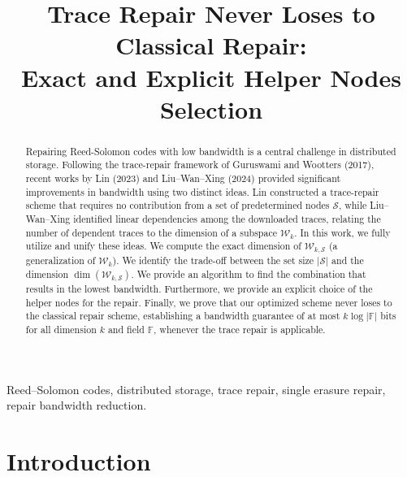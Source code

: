 \documentclass[onecolumn]{IEEEtran}
\title{Trace Repair Never Loses to Classical Repair:\\ Exact and Explicit Helper Nodes Selection 
}
\author{

   \IEEEauthorblockN{Wilton Kim, Stanislav Kruglik, Han Mao Kiah}
	
}
\theoremstyle{plain}
\theoremstyle{definition}
\newcommand{\FF}{\mathbb{F}}
\newcommand{\cS}{\mathcal{S}}
\newcommand{\cW}{\mathcal{W}}
\newcommand{\hanmao}[1]{{\color{magenta} (HM: #1)}}
\begin{document}
\date{}

\maketitle

\begin{abstract}
Repairing Reed-Solomon codes with low bandwidth is a central challenge in distributed storage. Following the trace-repair framework of Guruswami and Wootters (2017), recent works by Lin (2023) and Liu--Wan--Xing (2024) provided significant improvements in bandwidth using two distinct ideas. Lin constructed a trace-repair scheme that requires no contribution from a set of predetermined nodes $\cS$, while Liu--Wan--Xing identified linear dependencies among the downloaded traces, relating the number of dependent traces to the dimension of a subspace $\cW_k$.
In this work, we fully utilize and unify these ideas. We compute the exact dimension of $\cW_{k,\cS}$ (a generalization of $\cW_k$). We identify the trade-off between the set size $|\cS|$ and the dimension $\dim(\cW_{k,\cS})$. We provide an algorithm to find the combination that results in the lowest bandwidth. Furthermore, we provide an explicit choice of the helper nodes for the repair. Finally, we prove that our optimized scheme never loses to the classical repair scheme, establishing a bandwidth guarantee of at most $k\log|\FF|$ bits for all dimension $k$ and field $\FF$, whenever the trace repair is applicable.
\end{abstract}
\begin{IEEEkeywords}
Reed–Solomon codes, distributed storage, trace repair, single erasure repair, repair bandwidth reduction.
\end{IEEEkeywords}
\section{Introduction}
\end{document}
